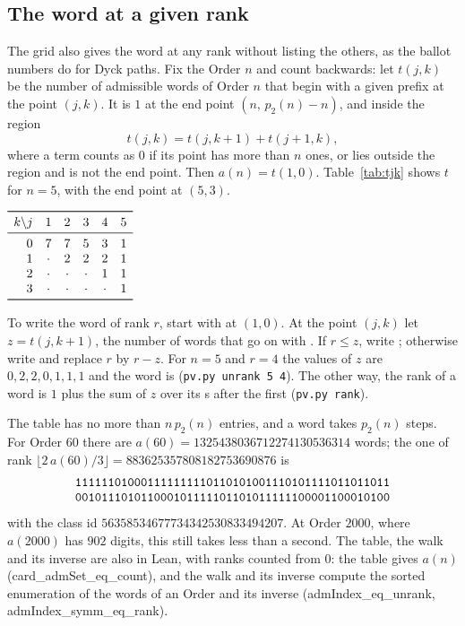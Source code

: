 \documentclass[10pt,a4paper,titlepage]{article}
\newcommand{\lean}[1]{\textsf{#1}}
\newcommand{\pv}[1]{\texttt{pv.py #1}}
\begin{document}
\subsection*{The word at a given rank}

The grid also gives the word at any rank without listing the others, as the
ballot numbers do for Dyck paths. Fix the Order $n$ and count backwards: let
$t(j,k)$ be the number of admissible words of Order $n$ that begin with a given
prefix at the point $(j,k)$. It is $1$ at the end point $(n,\, p_2(n) - n)$, and
inside the region
\[
t(j,k) = t(j,k+1) + t(j+1,k),
\]
where a term counts as $0$ if its point has more than $n$ ones, or lies outside
the region and is not the end point. Then $a(n) = t(1,0)$. Table~\ref{tab:tjk}
shows $t$ for $n = 5$, with the end point at $(5,3)$.

\begin{table}[htbp]
\centering
$\begin{array}{r ccccc}
\toprule
k \backslash j & 1 & 2 & 3 & 4 & 5 \\
\midrule
0 & 7 & 7 & 5 & 3 & 1 \\
1 & \cdot & 2 & 2 & 2 & 1 \\
2 & \cdot & \cdot & \cdot & 1 & 1 \\
3 & \cdot & \cdot & \cdot & \cdot & 1 \\
\bottomrule
\end{array}$
\caption{The backward count $t(j,k)$ for Order $5$: $j$ ones across, $k$ zeros down.}
\label{tab:tjk}
\end{table}

To write the word of rank $r$, start with  at $(1,0)$. At the point $(j,k)$
let $z = t(j, k+1)$, the number of words that go on with . If
$r \le z$, write ; otherwise write  and replace $r$ by $r - z$. For
$n = 5$ and $r = 4$ the values of $z$ are $0, 2, 2, 0, 1, 1, 1$ and the word is
 (\pv{unrank 5 4}). The other way, the rank of a word is $1$ plus
the sum of $z$ over its s after the first (\pv{rank}).

The table has no more than $n\,p_2(n)$ entries, and a word takes $p_2(n)$ steps.
For Order $60$ there are $a(60) = 1325438036712274130536314$ words; the one of rank
$\lfloor 2\,a(60)/3 \rfloor = 883625357808182753690876$ is
\[
\begin{array}{l}
\text{\texttt{111111010001111111110110101001110101111011011011}} \\
\text{\texttt{001011101011000101111101101011111100001100010100}}
\end{array}
\]
with the class id $56358534677734342530833494207$. At Order $2000$, where $a(2000)$
has $902$ digits, this still takes less than a second. The table, the walk and
its inverse are also in Lean, with ranks counted from $0$: the table gives $a(n)$
(\lean{card\_admSet\_eq\_count}), and the walk and its inverse compute the sorted
enumeration of the words of an Order and its inverse (\lean{admIndex\_eq\_unrank},
\lean{admIndex\_symm\_eq\_rank}).
\end{document}
